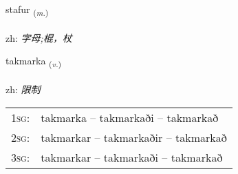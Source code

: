 \documentclass[frontgrid, backgrid]{flacards}\usepackage[]{graphicx}\usepackage[]{color}
\begin{document}
\renewcommand{\flhead}{\vskip5pt \fboxsep=0pt {\small\bfseries\footnotesize Nafnorð | 名词}}
\renewcommand{\fcfoot}{\vskip5pt \fboxsep=0pt \hspace{2pt}{\small\bfseries\footnotesize 2K}}

\renewcommand{\blhead}{\vskip5pt {\small\bfseries\footnotesize Nafnorð | 名词 }}
\renewcommand{\bcfoot}{\vskip5pt \hspace{2pt}{\small\bfseries\footnotesize 2K}}


{stafur \small{\textsubscript{(\textit{m.})}} \\[1ex] %
\textphonetic{[staːvʏr]} \\
zh: \emph{字母;棍，杖} \\  [2ex]
\renewcommand*{\arraystretch}{0.8}
}

\renewcommand{\flhead}{\vskip5pt \fboxsep=0pt {\small\bfseries\footnotesize Sagnorð | 动词}}
\renewcommand{\fcfoot}{\vskip5pt \fboxsep=0pt \hspace{2pt}{\small\bfseries\footnotesize 2K}}

\renewcommand{\blhead}{\vskip5pt {\small\bfseries\footnotesize Sagnorð | 动词 }}
\renewcommand{\bcfoot}{\vskip5pt \hspace{2pt}{\small\bfseries\footnotesize 2K}}


{takmarka \small{\textsubscript{(\textit{v.})}} \\[1ex] %
\textphonetic{[tʰakmar̥ka]} \\
zh: \emph{限制} \\  [2ex]
\renewcommand*{\arraystretch}{0.8}
\begin{tabular}{p{1cm}l}
\textsc{1sg}: & takmarka -- takmarkaði -- takmarkað \\ 
\textsc{2sg}: & takmarkar -- takmarkaðir -- takmarkað \\ 
\textsc{3sg}: & takmarkar -- takmarkaði -- takmarkað \\ 
\end{tabular}
}
\end{document}
